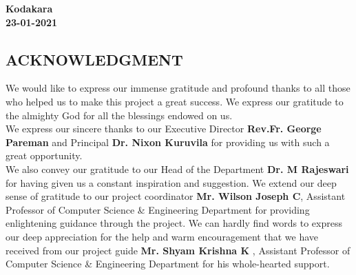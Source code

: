 \documentclass[12pt,a4paper]{report}
\begin{document}
\begin{titlepage}
\begin{center}
\begin{flushright}
 
  
\end{flushright}
\end{center}
\vspace{-12pt} 
\begin{flushleft}
\textbf{Kodakara}\\
\textbf{23-01-2021}
\end{flushleft}




\end{titlepage}





\newpage
\pagestyle{plain}

\begin{center}
\section*{ACKNOWLEDGMENT}
\end{center}
\onehalfspacing
\hspace*{0.5cm}We would like to express our immense gratitude and profound thanks to all those who helped us to make this project a great success. We express our gratitude to the almighty God for all the blessings endowed on us.\\

\hspace*{0.5cm}We express our sincere thanks to our Executive Director \textbf{Rev.Fr. George Pareman} and Principal \textbf{Dr. Nixon Kuruvila} for providing us with such a great opportunity.\\

\hspace*{0.5cm}We also convey our gratitude to our Head of the Department \textbf{Dr. M Rajeswari} for having given us a constant inspiration and suggestion. We extend our deep sense of gratitude to our project coordinator \textbf{Mr. Wilson Joseph C}, Assistant Professor of Computer Science \& Engineering Department for providing enlightening guidance through the project. We can hardly find words to express our deep appreciation for the help and warm encouragement that we have received from our project guide \textbf{Mr. Shyam Krishna K }, Assistant Professor of Computer Science \& Engineering Department for his whole-hearted support.\\
\end{document}
